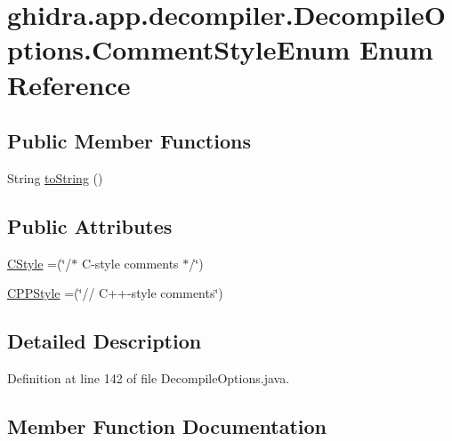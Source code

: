\hypertarget{enumghidra_1_1app_1_1decompiler_1_1_decompile_options_1_1_comment_style_enum}{}\section{ghidra.\+app.\+decompiler.\+Decompile\+Options.\+Comment\+Style\+Enum Enum Reference}
\label{enumghidra_1_1app_1_1decompiler_1_1_decompile_options_1_1_comment_style_enum}
\subsection*{Public Member Functions}
\begin{DoxyCompactItemize}
\item 
String \mbox{\hyperlink{enumghidra_1_1app_1_1decompiler_1_1_decompile_options_1_1_comment_style_enum_ad371fd7b537e61f5f4c2e3b77bd1080c}{to\+String}} ()
\end{DoxyCompactItemize}
\subsection*{Public Attributes}
\begin{DoxyCompactItemize}
\item 
\mbox{\hyperlink{enumghidra_1_1app_1_1decompiler_1_1_decompile_options_1_1_comment_style_enum_a98660d056ec7ea9edf9be6bca2205361}{C\+Style}} =(\char`\"{}/$\ast$ C-\/style comments $\ast$/\char`\"{})
\item 
\mbox{\hyperlink{enumghidra_1_1app_1_1decompiler_1_1_decompile_options_1_1_comment_style_enum_aeb969896d5643b49b09405043aff24d6}{C\+P\+P\+Style}} =(\char`\"{}// C++-\/style comments\char`\"{})
\end{DoxyCompactItemize}


\subsection{Detailed Description}


Definition at line 142 of file Decompile\+Options.\+java.



\subsection{Member Function Documentation}
\mbox{\label{enumghidra_1_1app_1_1decompiler_1_1_decompile_options_1_1_comment_style_enum_ad371fd7b537e61f5f4c2e3b77bd1080c}} 
